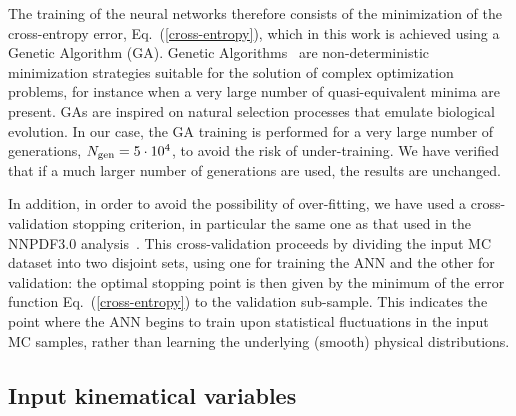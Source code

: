  
 The training of the neural networks therefore consists of the
 minimization of the cross-entropy error,
 Eq.~(\ref{cross-entropy}), which in this work is achieved using a
 Genetic Algorithm (GA).
 Genetic Algorithms~\cite{quevedo,tau,Abel:2014xta,Nesseris:2012tt} are
 non-deterministic
 minimization strategies suitable for the solution
 of complex optimization problems, for instance when a very large number
 of quasi-equivalent minima are present.
 GAs are inspired on natural selection processes
 that emulate biological evolution. 
 In our case, the GA training is performed for a very large 
 number of generations, $N_{\rm gen}=5\cdot 10^{4}$, to avoid the risk of
 under-training.
 We have verified that if a much larger number of generations
 are used, the results are unchanged.

 In addition,
 in order to avoid the possibility of over-fitting,
 we have used a cross-validation stopping
 criterion, in particular the same one as
 that used in the NNPDF3.0 analysis~\cite{Ball:2014uwa}.
 This cross-validation proceeds by dividing the input MC dataset into two disjoint sets,
 using one for training the ANN and the other for validation: the optimal
 stopping point is then given by the minimum of the error function
 Eq.~(\ref{cross-entropy}) to the validation sub-sample.
 This indicates the point where
the ANN begins to train upon  statistical fluctuations
in the input MC samples, rather than learning
the underlying (smooth) physical  distributions.
 

 \subsection{Input kinematical variables}
 \label{sec:input}

